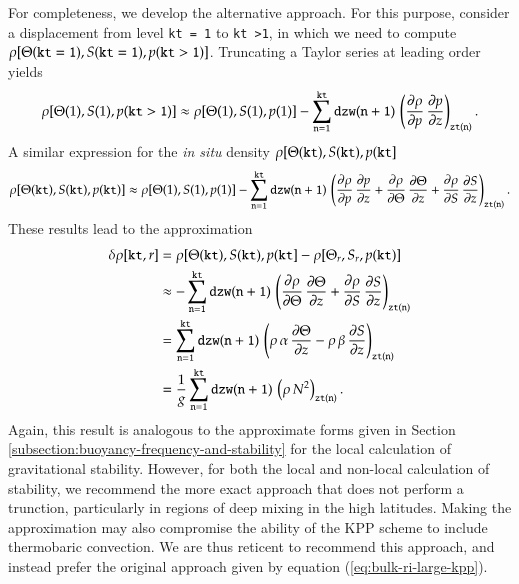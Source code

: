For completeness, we develop the alternative approach.  For this
purpose, consider a displacement from level {\tt kt = 1} to {\tt kt
  >1}, in which we need to compute $\rho[\Theta({\tt kt=1}),S({\tt
  kt=1}),p({\tt kt>1})]$.  Truncating a Taylor series at leading order
yields
\begin{equation}
 \rho[\Theta(1),S(1),p({\tt kt>1})]
 \approx 
 \rho[\Theta(1),S(1),p(1)] 
 - \sum\limits_{{\tt n  = 1}}^{{\tt kt}}
   {\tt dzw(n+1)} \,  \left( \frac{\partial \rho}{\partial p} \, \frac{\partial p}{\partial z}
   \right)_{ {\tt zt(n)} }.
\end{equation}
A similar expression for the {\it in situ} density $\rho[\Theta({\tt
  kt}), S({\tt kt}), p({\tt kt} ]$
\begin{equation}
 \rho[\Theta({\tt kt}),S({\tt kt}),p({\tt kt})]
 \approx 
 \rho[\Theta(1),S(1),p(1)] 
 - \sum\limits_{{\tt n  = 1}}^{{\tt kt}}
   {\tt dzw(n+1)} \,  \left( 
   \frac{\partial \rho}{\partial p} \, \frac{\partial p}{\partial z}
   + 
  \frac{\partial \rho}{\partial \Theta} \, \frac{\partial \Theta}{\partial z}
  +
  \frac{\partial \rho}{\partial S} \, \frac{\partial S}{\partial z}
   \right)_{ {\tt zt(n)} }.
\end{equation}
These results lead to the approximation 
\begin{equation}
\begin{split}
 \delta\rho[{\tt kt},r]  &= \rho[\Theta({\tt kt}), S({\tt kt}), p({\tt kt} ]  -\rho[\Theta_{r}, S_{r}, p({\tt kt})]
 \\
 &\approx 
 -\sum\limits_{{\tt n  = 1}}^{{\tt kt}}
   {\tt dzw(n+1)} \,  \left( 
 \frac{\partial \rho}{\partial \Theta} \, \frac{\partial \Theta}{\partial z}
  +
  \frac{\partial \rho}{\partial S} \, \frac{\partial S}{\partial z}
   \right)_{ {\tt zt(n)} }
\\
 &=
 \sum\limits_{{\tt n  = 1}}^{{\tt kt}}
   {\tt dzw(n+1)} \,  \left( 
 \rho \, \alpha \, \frac{\partial \Theta}{\partial z}
  -
  \rho \, \beta \, \frac{\partial S}{\partial z}
   \right)_{ {\tt zt(n)} }
\\
 &= 
 \frac{1}{g} 
  \sum\limits_{{\tt n  = 1}}^{{\tt kt}}
   {\tt dzw(n+1)} \,  \left( \rho \, N^{2} \right)_{ {\tt zt(n)} }.
\end{split}
\label{eq:summed-n2-for-nonlocal-stability}
\end{equation}
Again, this result is analogous to the approximate forms given in
Section \ref{subsection:buoyancy-frequency-and-stability} for the
local calculation of gravitational stability.  However, for both the
local and non-local calculation of stability, we recommend the more
exact approach that does not perform a trunction, particularly in
regions of deep mixing in the high latitudes. Making the approximation
may also compromise the ability of the KPP scheme to include
thermobaric convection.  We are thus reticent to recommend this
approach, and instead prefer the original approach given by equation
(\ref{eq:bulk-ri-large-kpp}).



